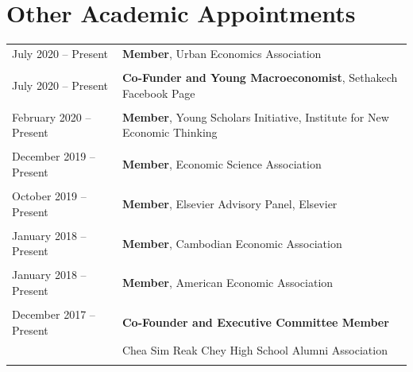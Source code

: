 \documentclass[10pt,a4paper]{article}
\begin{document}
	\section*{Other Academic Appointments}
	\noindent 
		\begin{tabular}{@{} l l}
			\vspace{-1em}
			\hspace{1em} July 2020 -- Present & \textbf{Member}, Urban Economics Association	\\
			& \\ 
			
			\vspace{-1em}
			\hspace{1em} July 2020 -- Present & \textbf{Co-Funder and Young Macroeconomist}, Sethakech Facebook Page\\
			& \\ 
			
			\vspace{-1em}
			\hspace{1em} February 2020 -- Present & \textbf{Member}, Young Scholars Initiative, Institute for New Economic Thinking\\
			& \\
			
			
			\vspace{-1em}
			\hspace{1em} December 2019 -- Present & \textbf{Member}, Economic Science Association\\
			& \\ 
			\vspace{-1em}
			
			\hspace{1em} October 2019 -- Present	& \textbf{Member}, Elsevier Advisory Panel, Elsevier \\
			& \\ 
			\vspace{-1em}
			
			\hspace{1em} January 2018 -- Present	& \textbf{Member}, Cambodian Economic Association \\
			& \\
			\vspace{-1em}
			
			\hspace{1em} January 2018 -- Present	& \textbf{Member}, American Economic Association \\
			& \\
			
			\hspace{1em} December 2017 -- Present    & \textbf{Co-Founder and Executive Committee Member} \\
			& Chea Sim Reak Chey High School Alumni Association \\
			& \vspace{-1em} \\
			
		\end{tabular}
	
\end{document}
